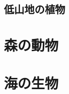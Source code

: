 \documentclass[10pt,titlepage,a5paper]{ltjsbook}
\begin{document}
  \subsection{低山地の植物}
    

\section{森の動物}
\section{海の生物}
\end{document}
